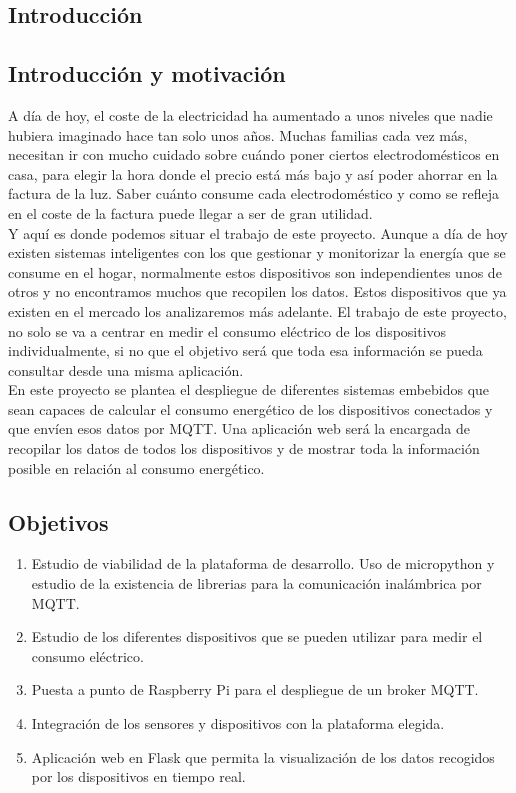 \begin{titlepage}

\chapter{Introducción}
\section{Introducción y motivación}
A día de hoy, el coste de la electricidad ha aumentado a unos niveles que nadie hubiera imaginado hace tan solo unos años. Muchas familias cada vez más, necesitan ir con mucho cuidado sobre cuándo poner ciertos electrodomésticos en casa, para elegir la hora donde el precio está más bajo y así poder ahorrar en la factura de la luz. Saber cuánto consume cada electrodoméstico y como se refleja en el coste de la factura puede llegar a ser de gran utilidad. \\

Y aquí es donde podemos situar el trabajo de este proyecto. Aunque a día de hoy existen sistemas inteligentes con los que gestionar y monitorizar la energía que se consume en el hogar, normalmente estos dispositivos son independientes unos de otros y no encontramos muchos que recopilen los datos. Estos dispositivos que ya existen en el mercado los analizaremos más adelante. El trabajo de este proyecto, no solo se va a centrar en medir el consumo eléctrico de los dispositivos individualmente, si no que el objetivo será que toda esa información se pueda consultar desde una misma aplicación. \\

En este proyecto se plantea el despliegue de diferentes sistemas embebidos que sean capaces de calcular el consumo energético de los dispositivos conectados y que envíen esos datos por MQTT. Una aplicación web será la encargada de recopilar los datos de todos los dispositivos y de mostrar toda la información posible en relación al consumo energético.\\

\section{Objetivos}

\begin{enumerate}
\item Estudio de viabilidad de la plataforma de desarrollo. Uso de micropython y estudio de la existencia de librerias para la comunicación inalámbrica por MQTT.
\item Estudio de los diferentes dispositivos que se pueden utilizar para medir el consumo eléctrico. 
\item Puesta a punto de Raspberry Pi para el despliegue de un broker MQTT.
\item Integración de los sensores y dispositivos con la plataforma elegida.
\item Aplicación web en Flask que permita la visualización de los datos recogidos por los dispositivos en tiempo real.
\end{enumerate}


\end{titlepage}
